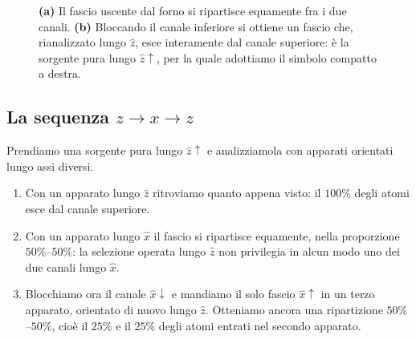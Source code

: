 \begin{figure}[htbp]
\centering
{}
\caption[Costruzione di una sorgente pura]{%
\textbf{(a)} Il fascio uscente dal forno si ripartisce equamente fra i due
canali. \textbf{(b)} Bloccando il canale inferiore si ottiene un fascio che,
rianalizzato lungo $\hat{z}$, esce interamente dal canale superiore: è la
sorgente pura lungo $\hat{z}\!\uparrow$, per la quale adottiamo il simbolo
compatto a destra.}
\label{fig:sorgente-pura}
\end{figure}
 
 
\subsection{La sequenza $z \to x \to z$}
 
Prendiamo una sorgente pura lungo $\hat{z}\!\uparrow$ e analizziamola con apparati orientati lungo assi diversi.
 
\begin{enumerate}
    \item Con un apparato lungo $\hat{z}$ ritroviamo quanto appena visto: il $100\%$ degli atomi esce dal canale superiore.
 
    \item Con un apparato lungo $\hat{x}$ il fascio si ripartisce equamente, nella proporzione $50\%$--$50\%$: la selezione operata lungo $\hat{z}$ non privilegia in alcun modo uno dei due canali lungo $\hat{x}$.
 
    \item Blocchiamo ora il canale $\hat{x}\!\downarrow$ e mandiamo il solo fascio $\hat{x}\!\uparrow$ in un terzo apparato, orientato di nuovo lungo $\hat{z}$. Otteniamo ancora una ripartizione $50\%$--$50\%$, cioè il $25\%$ e il $25\%$ degli atomi entrati nel secondo apparato.
\end{enumerate}
 

